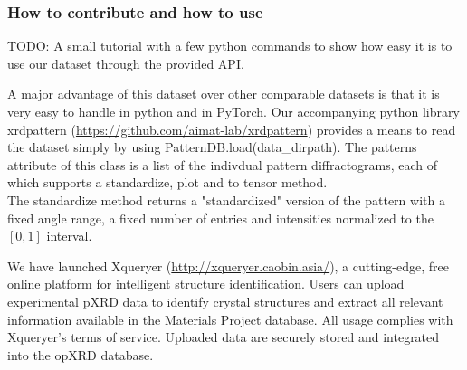 \subsubsection*{How to contribute and how to use}

TODO: A small tutorial with a few python commands to show how easy it is to use our dataset through the provided API.

A major advantage of this dataset over other comparable datasets is that it is very easy to handle in python and in PyTorch.
Our accompanying python library xrdpattern (\url{https://github.com/aimat-lab/xrdpattern}) provides a means to read the dataset simply by using PatternDB.load(data\_dirpath). The patterns attribute of this class is a list of the indivdual pattern diffractograms, each of which supports a standardize, plot and to tensor method. \\
The standardize method returns a "standardized" version of the pattern with a fixed angle range, a fixed number of entries and intensities normalized to the $[0,1]$ interval.

% 
We have launched Xqueryer (\url{http://xqueryer.caobin.asia/}), a cutting-edge, free online platform for intelligent structure identification. Users can upload experimental pXRD data to identify crystal structures and extract all relevant information available in the Materials Project database. All usage complies with Xqueryer's terms of service. Uploaded data are securely stored and integrated into the opXRD database.